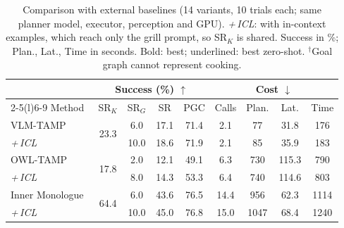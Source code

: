\newcommand{\icl}{\hspace{0.6em}\textit{+\,ICL}}
\begin{table}[t]
\centering
\footnotesize
\setlength{\tabcolsep}{2.2pt}
\renewcommand{\arraystretch}{1.05}
\caption{Comparison with external baselines (14 variants, 10 trials each; same planner model,
executor, perception and GPU). \textit{+\,ICL}: with in-context examples, which reach only the grill
prompt, so SR$_K$ is shared. Success in \%; Plan., Lat., Time in seconds. Bold: best; underlined: best
zero-shot. $^\dagger$Goal graph cannot represent cooking.}
\label{tab:baselines}
\begin{tabular*}{\columnwidth}{@{\extracolsep{\fill}}l cccc cccc@{}}
\toprule
& \multicolumn{4}{c}{Success (\%) $\uparrow$} & \multicolumn{4}{c}{Cost $\downarrow$} \\
\cmidrule(lr){2-5}\cmidrule(l){6-9}
Method & SR$_K$ & SR$_G$ & SR & PGC & Calls & Plan. & Lat. & Time \\
\midrule
VLM-TAMP~\cite{vlmtamp}               & \multirow{2}{*}{23.3} & 6.0 & 17.1 & 71.4 & 2.1 & 77 & 31.8 & 176 \\
\icl                                   & & 10.0 & 18.6 & 71.9 & 2.1 & 85 & 35.9 & 183 \\
\addlinespace[2pt]
OWL-TAMP~\cite{owltamp}               & \multirow{2}{*}{17.8} & 2.0 & 12.1 & 49.1 & 6.3 & 730 & 115.3 & 790 \\
\icl                                   & & 8.0 & 14.3 & 53.3 & 6.4 & 740 & 114.6 & 803 \\
\addlinespace[2pt]
Inner Monologue~\cite{innermonologue} & \multirow{2}{*}{64.4} & 6.0 & 43.6 & 76.5 & 14.4 & 956 & 62.3 & 1114 \\
\icl                                   & & 10.0 & 45.0 & 76.8 & 15.0 & 1047 & 68.4 & 1240 \\

\end{tabular*}
\end{table}

